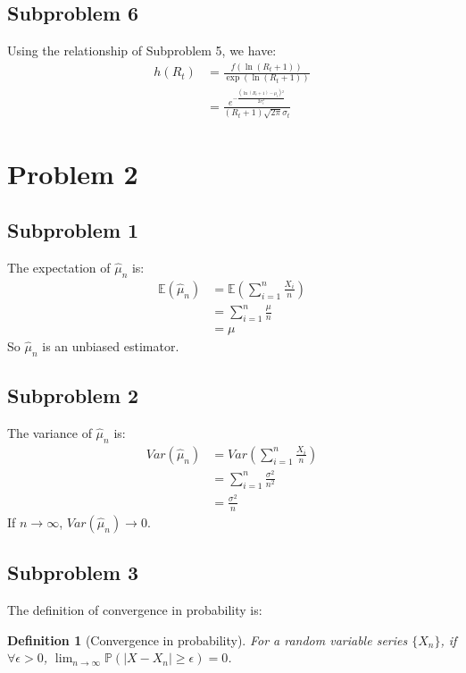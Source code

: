 \documentclass{article}
\theoremstyle{break}
\newtheorem*{definition}{Definition}
\begin{document}
    \subsection{Subproblem 6}
    Using the relationship of Subproblem 5, we have:
    \begin{align*}
        h(R_t)&=\frac{f(\ln{(R_t+1)})}{\exp(\ln{(R_t+1)})}\\
        &=\frac{e^{-\frac{\left(\ln{(R_t+1)}-\mu _t\right){}^2}{2 \sigma _t^2}}}{{(R_t+1)}\sqrt{2 \pi } \sigma _t}
    \end{align*}
    \section{Problem 2}
    \subsection{Subproblem 1}
    The expectation of $\hat{\mu}_n$ is:
    \begin{align*}
        \mathbb{E}(\hat{\mu}_n)&=\mathbb{E}(\sum_{i=1}^n{\frac{X_i}{n}})\\
        &=\sum_{i=1}^n{\frac{\mu}{n}}\\
        &=\mu
    \end{align*}
    So $\hat{\mu}_n$ is an unbiased estimator.
    \subsection{Subproblem 2}
    The variance of $\hat{\mu}_n$ is:
    \begin{align*}
        Var(\hat{\mu}_n)&=Var(\sum_{i=1}^n{\frac{X_i}{n}})\\
        &=\sum_{i=1}^n{\frac{\sigma^2}{n^2}}\\
        &=\frac{\sigma^2}{n}
    \end{align*}
    If $n\to \infty$, $Var(\hat{\mu}_n)\to 0$.
    \subsection{Subproblem 3}
    The definition of convergence in probability is:
    \begin{definition}[Convergence in probability]
        For a random variable series $\{X_n\}$, if $\forall \epsilon > 0$,
         $\lim_{n\to\infty}\mathbb{P}(|X-X_n|\geq\epsilon)=0$.
    \end{definition}
\end{document}
